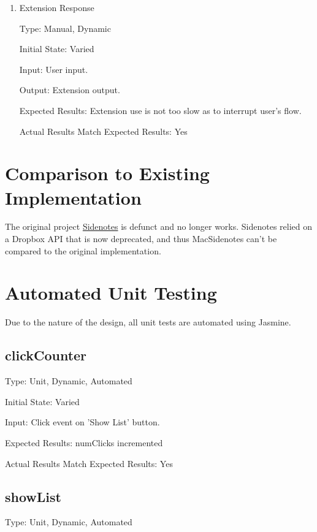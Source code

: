\documentclass[12pt, titlepage]{article}
\begin{document}
\begin{enumerate}
	
	\item{Extension Response\\}
	
	Type: Manual, Dynamic
	
	Initial State: Varied
	
	Input: User input.
	
	Output: Extension output.
	
	Expected Results: Extension use is not too slow as to interrupt user's flow.
	
	Actual Results Match Expected Results: Yes
	
\end{enumerate}
	
\section{Comparison to Existing Implementation}	

The original project 
\href{https://github.com/sidenotes/sidenotes}{Sidenotes} is defunct and no 
longer works. Sidenotes relied on a Dropbox API that is now deprecated, and 
thus MacSidenotes can't be compared to the original implementation.

\section{Automated Unit Testing}

Due to the nature of the design, all unit tests are automated using Jasmine.



\subsection{clickCounter}

	Type: Unit, Dynamic, Automated

	Initial State: Varied

	Input: Click event on 'Show List' button.

	Expected Results: numClicks incremented

	Actual Results Match Expected Results: Yes
	
\subsection{showList}

	Type: Unit, Dynamic, Automated
\end{document}
